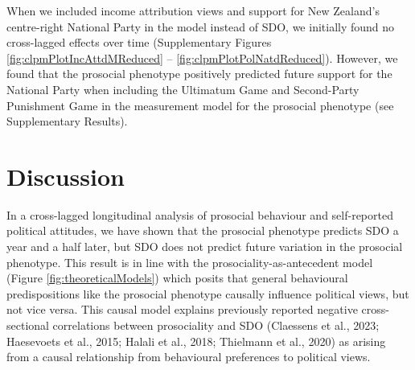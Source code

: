 \documentclass[
  man,floatsintext]{apa6}
\begin{document}
When we included income attribution views and support for New Zealand's
centre-right National Party in the model instead of SDO, we initially found no
cross-lagged effects over time (Supplementary Figures
\ref{fig:clpmPlotIncAttdMReduced} -- \ref{fig:clpmPlotPolNatdReduced}).
However, we found that the prosocial phenotype positively predicted future
support for the National Party when including the Ultimatum Game and
Second-Party Punishment Game in the measurement model for the prosocial
phenotype (see Supplementary Results).

\hypertarget{discussion}{%
\section{Discussion}\label{discussion}}

In a cross-lagged longitudinal analysis of prosocial behaviour and
self-reported political attitudes, we have shown that the prosocial phenotype
predicts SDO a year and a half later, but SDO does not predict future variation
in the prosocial phenotype. This result is in line with the
prosociality-as-antecedent model (Figure \ref{fig:theoreticalModels}) which
posits that general behavioural predispositions like the prosocial phenotype
causally influence political views, but not vice versa. This causal model
explains previously reported negative cross-sectional correlations between
prosociality and SDO (Claessens et al., 2023; Haesevoets et al., 2015; Halali et al., 2018; Thielmann et al., 2020) as arising from a causal relationship from behavioural
preferences to political views.
\end{document}
